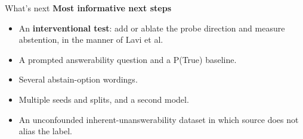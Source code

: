 \documentclass[aspectratio=169,11pt,usepdftitle=false]{beamer}
\begin{document}
\begin{frame}{What's next}
\normalsize
\textbf{Most informative next steps}
\begin{itemize}
\item An \textbf{interventional test}: add or ablate the probe direction and measure abstention, in the manner of Lavi et al.
\item A prompted answerability question and a P(True) baseline.
\item Several abstain-option wordings.
\item Multiple seeds and splits, and a second model.
\item An unconfounded inherent-unanswerability dataset in which source does not alias the label.
\end{itemize}
\end{frame}
\end{document}
